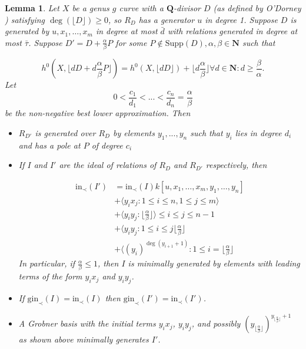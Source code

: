\documentclass{amsart}
\theoremstyle{plain}
\newtheorem{lem}[thm]{Lemma}
\theoremstyle{definition}
\theoremstyle{remark}
\numberwithin{equation}{section}
\newcommand \Supp{\text{Supp}}
\newcommand \initial{\text{in}}
\newcommand \gin{\text{gin}}
\begin{document}
\begin{lem}
\label{lem:deg1_sat_ind}
Let $X$ be a genus $g$ curve with a $\mathbf{Q}$-divisor $D$ (as
defined by O'Dorney )
satisfying $\deg(\lfloor{D}\rfloor)\ge 0$, so $R_D$ has a
generator $u$ in degree 1.  Suppose $D$ is generated by $
u, x_1, \ldots, x_m$ in degree at most $\bar{d}$ with relations generated 
in degree at most $\bar{\tau}$.  Suppose $D' = D + \frac{\alpha}{\beta} P$
for some $P \not \in \Supp(D), \alpha,\beta \in \mathbf{N}$ such
that

\begin{equation}
\label{eqn:deg1_sat_ind_dim}
	h^0(X, \lfloor{dD + d\frac{\alpha}{\beta} P \rfloor}) = h^0(X,\lfloor dD
	\rfloor) + \lfloor d\frac{\alpha} {\beta} \rfloor \forall d \in \mathbf{
	N} : d \ge \frac{\beta}{\alpha}.
\end{equation}
Let 
\[
	0<\frac{c_1}{d_1}<...<\frac{c_n}{d_n}=\frac{\alpha}{\beta}
\]
be the non-negative best lower approximation.
Then 
\begin{itemize}
\item $R_{D'}$ is generated over $R_D$ by elements $y_1,...,y_n$ such that $y_i$ lies in  
degree $d_i$ and has a pole at $P$ of degree $c_i$

\item If $I$ and $I'$ are the ideal of relations of $R_D$ and $R_{D'}$ respectively, then 

\begin{align*}
	\initial_\prec(I') &= \initial_\prec(I) k[u, x_1, \ldots, x_m, y_1, \ldots, y_n] \\
										 &+ \langle y_i x_j: 1 \le i \le n, 1 \le j \le m \rangle \\
										 &+ \langle y_i y_j: \lfloor \frac{\alpha}{\beta} \rfloor \rangle \le i \le j \le n-1 \\
										 &+ \langle y_i y_j: 1\le i\le j\lfloor \frac{\alpha}{\beta} \rfloor\\
										 &+ \langle (y_i)^{\deg(y_{i+1}+1)}: 1\le i=\lfloor \frac{\alpha}{\beta} \rfloor
\end{align*}
In particular, if $\frac{\alpha}{\beta}\le 1$, then $I$ is minimally generated by elements with leading terms of the form $y_ix_j$ and $y_iy_j$.
\item If $\gin_\prec(I)=\initial_\prec(I)$ then $\gin_\prec(I')=\initial_\prec(I')$.
\item A Grobner basis with the initial terms $y_i x_j$, $y_iy_j$, and possibly $(y_{\lfloor \frac{\alpha}{\beta} \rfloor})^{y_{\lfloor \frac{\alpha}{\beta} \rfloor}+1}$ as shown above minimally generates $I'$.
\end{itemize}
\end{lem}
\end{document}
